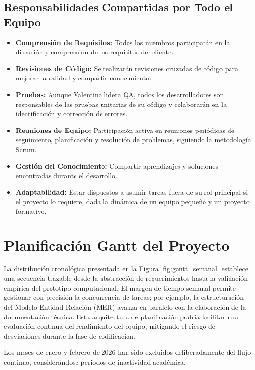 \subsection{Responsabilidades Compartidas por Todo el Equipo}
\begin{itemize}
	\item \textbf{Comprensión de Requisitos:} Todos los miembros participarán en la discusión y comprensión de los requisitos del cliente.
	\item \textbf{Revisiones de Código:} Se realizarán revisiones cruzadas de código para mejorar la calidad y compartir conocimiento.
	\item \textbf{Pruebas:} Aunque Valentina lidera QA, todos los desarrolladores son responsables de las pruebas unitarias de su código y colaborarán en la identificación y corrección de errores.
	\item \textbf{Reuniones de Equipo:} Participación activa en reuniones periódicas de seguimiento, planificación y resolución de problemas, siguiendo la metodología Scrum.
	\item \textbf{Gestión del Conocimiento:} Compartir aprendizajes y soluciones encontradas durante el desarrollo.
	\item \textbf{Adaptabilidad:} Estar dispuestos a asumir tareas fuera de su rol principal si el proyecto lo requiere, dada la dinámica de un equipo pequeño y un proyecto formativo.
\end{itemize}




	\section{Planificación Gantt del Proyecto}
	
	La distribución cronológica presentada en la Figura \ref{fig:gantt_semanal} establece una secuencia trazable desde la abstracción de requerimientos hasta la validación empírica del prototipo computacional. El margen de tiempo semanal permite gestionar con precisión la concurrencia de tareas; por ejemplo, la estructuración del Modelo Entidad-Relación (MER) avanza en paralelo con la elaboración de la documentación técnica. Esta arquitectura de planificación podría facilitar una evaluación continua del rendimiento del equipo, mitigando el riesgo de desviaciones durante la fase de codificación.
	
	Los meses de enero y febrero de 2026 han sido excluidos deliberadamente del flujo continuo, considerándose periodos de inactividad académica.
	
